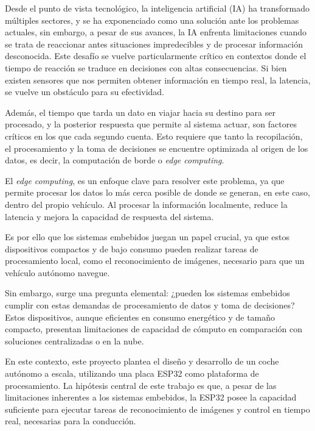 Desde el punto de vista tecnológico, la inteligencia artificial (IA) ha transformado múltiples sectores, y se ha exponenciado como una solución ante los problemas actuales, sin embargo, a pesar de sus avances, la IA enfrenta limitaciones cuando se trata de reaccionar antes situaciones impredecibles y de procesar información desconocida. Este desafío se vuelve particularmente crítico en contextos donde el tiempo de reacción se traduce en decisiones con altas consecuencias. Si bien existen sensores que nos permiten obtener información en tiempo real, la latencia, se vuelve un obstáculo para su efectividad.

Además, el tiempo que tarda un dato en viajar hacia su destino para ser procesado, y la posterior respuesta que permite al sistema actuar, son factores críticos en los que cada segundo cuenta. Esto requiere que tanto la recopilación, el procesamiento y la toma de decisiones se encuentre optimizada al origen de los datos, es decir, la computación de borde o \textit{edge computing}.

El \textit{edge computing}, es un enfoque clave para resolver este problema, ya que permite procesar los datos lo más cerca posible de donde se generan, en este caso, dentro del propio vehículo. Al procesar la información localmente, reduce la latencia y mejora la capacidad de respuesta del sistema. 

Es por ello que los sistemas embebidos juegan un papel crucial, ya que estos dispositivos compactos y de bajo consumo pueden realizar tareas de procesamiento local, como el reconocimiento de imágenes, necesario para que un vehículo autónomo navegue.

Sin embargo, surge una pregunta elemental: ¿pueden los sistemas embebidos cumplir con estas demandas de procesamiento de datos y toma de decisiones? Estos dispositivos, aunque eficientes en consumo energético y de tamaño compacto, presentan limitaciones de capacidad de cómputo en comparación con soluciones centralizadas o en la nube.

En este contexto, este proyecto plantea el diseño y desarrollo de un coche autónomo a escala, utilizando una placa ESP32 como plataforma de procesamiento. La hipótesis central de este trabajo es que, a pesar de las limitaciones inherentes a los sistemas embebidos, la ESP32 posee la capacidad suficiente para ejecutar tareas de reconocimiento de imágenes y control en tiempo real, necesarias para la conducción.
